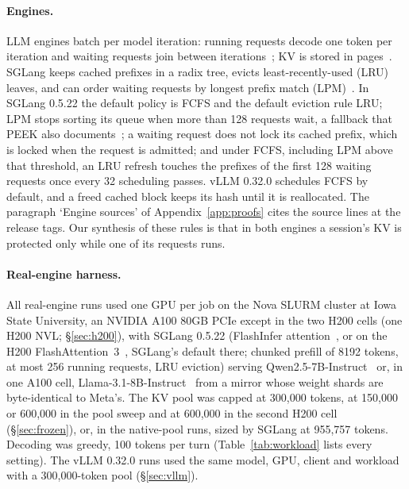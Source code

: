 \paragraph{Engines.}
LLM engines batch per model iteration: running requests decode one token per iteration and waiting requests join between iterations~\citep{yu2022orca}; KV is stored in pages~\citep{kwon2023vllm}. SGLang keeps cached prefixes in a radix tree, evicts least-recently-used (LRU) leaves, and can order waiting requests by longest prefix match (LPM)~\citep{zheng2024sglang}. In SGLang 0.5.22 the default policy is FCFS and the default eviction rule LRU; LPM stops sorting its queue when more than 128 requests wait, a fallback that PEEK also documents~\citep{xie2026peek}; a waiting request does not lock its cached prefix, which is locked when the request is admitted; and under FCFS, including LPM above that threshold, an LRU refresh touches the prefixes of the first 128 waiting requests once every 32 scheduling passes. vLLM 0.32.0 schedules FCFS by default, and a freed cached block keeps its hash until it is reallocated. The paragraph `Engine sources' of Appendix~\ref{app:proofs} cites the source lines at the release tags. Our synthesis of these rules is that in both engines a session's KV is protected only while one of its requests runs.

\paragraph{Real-engine harness.}\label{sec:harness}
All real-engine runs used one GPU per job on the Nova SLURM cluster at Iowa State University, an NVIDIA A100 80GB PCIe except in the two H200 cells (one H200 NVL; \S\ref{sec:h200}), with SGLang 0.5.22 (FlashInfer attention~\citep{ye2025flashinfer}, or on the H200 FlashAttention~3~\citep{shah2024flashattention3}, SGLang's default there; chunked prefill of 8192 tokens, at most 256 running requests, LRU eviction) serving Qwen2.5-7B-Instruct~\citep{qwen2024qwen25} or, in one A100 cell, Llama-3.1-8B-Instruct~\citep{grattafiori2024llama3} from a mirror whose weight shards are byte-identical to Meta's. The KV pool was capped at 300,000 tokens, at 150,000 or 600,000 in the pool sweep and at 600,000 in the second H200 cell (\S\ref{sec:frozen}), or, in the native-pool runs, sized by SGLang at 955,757 tokens. Decoding was greedy, 100 tokens per turn (Table~\ref{tab:workload} lists every setting). The vLLM 0.32.0 runs used the same model, GPU, client and workload with a 300,000-token pool (\S\ref{sec:vllm}).

